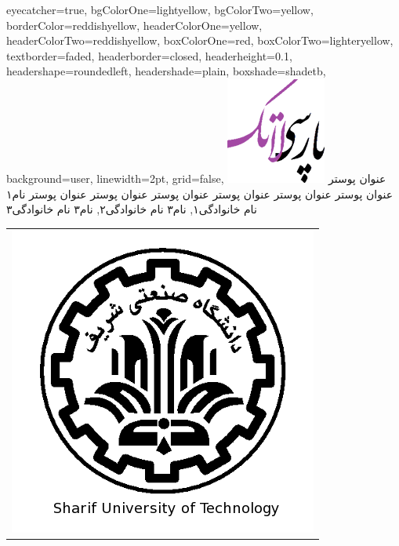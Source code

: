 \documentclass[debug,a0paper,portrait,persian]{xebaposter}
\begin{document}
      \begin{poster}%
      {
      eyecatcher=true,
      bgColorOne=lightyellow,
      bgColorTwo=yellow,
      borderColor=reddishyellow,
      headerColorOne=yellow,
      headerColorTwo=reddishyellow,
      boxColorOne=red,
      boxColorTwo=lighteryellow,
      textborder=faded,
      headerborder=closed,
      headerheight=0.1\textheight,
      headershape=roundedleft,
      headershade=plain,
      boxshade=shadetb,%
      background=user,%
      linewidth=2pt,
      grid=false,
      }
 {
      \includegraphics[height=0.07\textheight]{logo}
 }
 {عنوان پوستر عنوان پوستر عنوان پوستر عنوان پوستر عنوان پوستر عنوان پوستر عنوان پوستر 
}
 {\large نام۱ نام خانوادگی۱, نام۳ نام خانوادگی۲, نام۳ نام خانوادگی۳ 
 \\%
 {\normalsize\texttt{}}}
 {
\begin{tabular}{r}
    \includegraphics[height=0.07 \textheight]{shariflogo}\\
\end{tabular}
 }


\end{poster}
\end{document}
